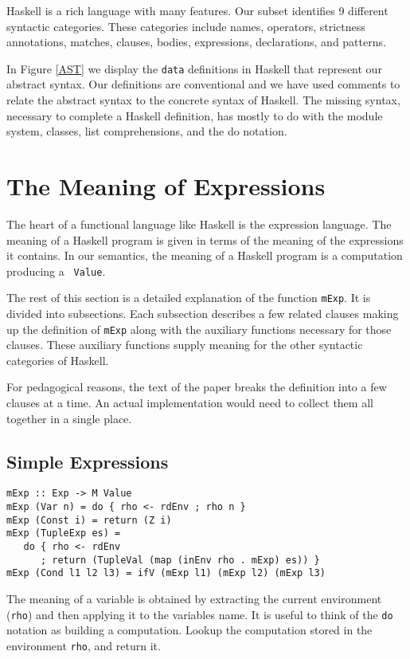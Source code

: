 \documentclass{entcs} \usepackage{entcsmacro}
\begin{document}
Haskell is a rich language with many features. Our subset identifies 9 different
syntactic categories. These categories include names, operators, strictness
annotations, matches, clauses,  bodies, expressions, declarations, and patterns.

In Figure \ref{AST} we display the {\tt data} definitions in Haskell that represent
our abstract syntax. Our definitions are conventional and we have used
comments to relate the abstract syntax to the concrete syntax of Haskell. The
missing syntax, necessary to complete a Haskell definition, has mostly to do with
the module system, classes, list comprehensions, and the do notation.


\section{The Meaning of Expressions}

The heart of a functional language like Haskell is the expression language. The meaning
of a Haskell program is given in terms of the meaning of the expressions it contains.
In our semantics, the meaning of a Haskell program is a computation producing a {\tt
Value}.

The rest of this section is a detailed explanation of the function {\tt mExp}. It is
divided into subsections. Each subsection describes a few related clauses making up
the definition of {\tt mExp} along with the auxiliary functions necessary for those
clauses. These auxiliary functions supply meaning for the other syntactic categories
of Haskell.

For pedagogical reasons, the text of the paper breaks the definition into a few clauses
at a time. An actual implementation would need to collect them all together in a
single place.

\subsection{Simple Expressions}


{\small
\begin{verbatim}
mExp :: Exp -> M Value
mExp (Var n) = do { rho <- rdEnv ; rho n }
mExp (Const i) = return (Z i)
mExp (TupleExp es) = 
   do { rho <- rdEnv 
      ; return (TupleVal (map (inEnv rho . mExp) es)) }
mExp (Cond l1 l2 l3) = ifV (mExp l1) (mExp l2) (mExp l3)
\end{verbatim}
}

The meaning of a variable is obtained by extracting the current environment ({\tt rho})
and then applying it to the variables name. It is useful to think of the {\tt do}
notation as building a computation. Lookup the computation stored in the
environment {\tt rho}, and return it.
\end{document}
